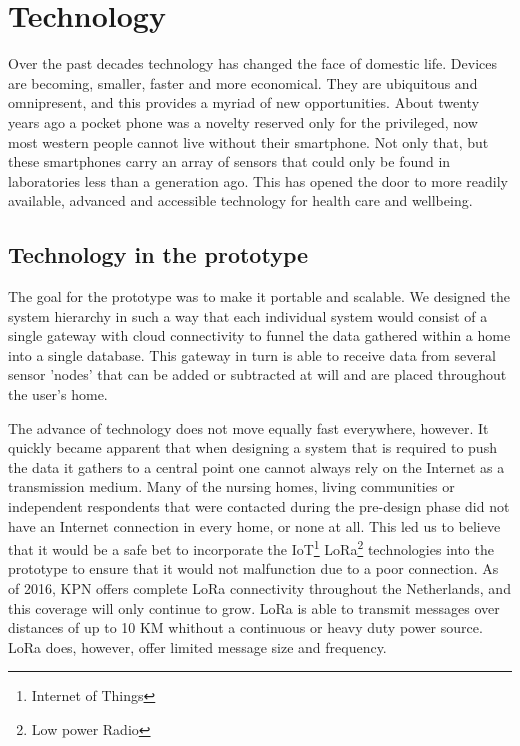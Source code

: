 \documentclass{below-ext}
\begin{document}
\section{Technology}
Over the past decades technology has changed the face of domestic life. Devices are becoming, smaller, faster and more economical. They are ubiquitous and omnipresent, and this provides a myriad of new opportunities. About twenty years ago a pocket phone was a novelty reserved only for the privileged, now most western people cannot live without their smartphone. Not only that, but these smartphones carry an array of sensors that could only be found in laboratories less than a generation ago. This has opened the door to more readily available, advanced and accessible technology for health care and wellbeing.

\subsection{Technology in the prototype}

The goal for the prototype was to make it portable and scalable. We designed the system hierarchy in such a way that each individual system would consist of a single gateway with cloud connectivity to funnel the data gathered within a home into a single database. This gateway  in turn is able to receive data from several sensor 'nodes' that can be added or subtracted at will and are placed throughout the user's home. 
 
The advance of technology does not move equally fast everywhere, however. It quickly became apparent that when designing a system that is required to push the data it gathers to a central point one cannot always rely on the Internet as a transmission medium. Many of the nursing homes, living communities or independent respondents that were contacted during the pre-design phase did not have an Internet connection in every home, or none at all. This led us to believe that it would be a safe bet to incorporate the IoT\footnote{Internet of Things} LoRa\footnote{Low power Radio} technologies into the prototype to ensure that it would not malfunction due to a poor connection. As of 2016, KPN offers complete LoRa connectivity throughout the Netherlands, and this coverage will only continue to grow. LoRa is able to transmit messages over distances of up to 10 KM whithout a continuous or heavy duty power source. LoRa does, however, offer limited message size and frequency. 
\end{document}
